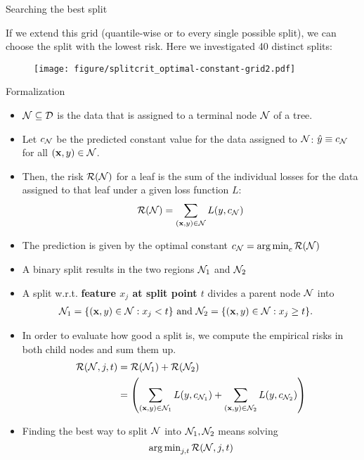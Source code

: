 \documentclass[11pt,compress,t,notes=noshow, xcolor=table]{beamer}
\begin{document}
\begin{vbframe}{Searching the best split}

If we extend this grid (quantile-wise or to every single possible split), we can choose the split with the lowest risk. 
Here we investigated 40 distinct splits:

\begin{figure}
\texttt{[image: figure/splitcrit\_optimal-constant-grid2.pdf]} 
\end{figure}


\end{vbframe}

\begin{vbframe}{Formalization}

\begin{itemize}
\item $\mathcal{N} \subseteq \mathcal{D}$ is the data that is assigned to a terminal node $\mathcal{N}$ of a tree.
\item Let $c_{\mathcal{N}}$ be the predicted constant value for the data assigned to $\mathcal{N}$: $\hat{y} \equiv c_{\mathcal{N}}$ for all $\left(\mathbf{x}, y\right) \in \mathcal{N}$.
\item Then, the risk $\mathcal{R}(\mathcal{N})$ for a leaf is the sum of the individual losses for the data assigned to that leaf under a given loss function $L$:
  $$\mathcal{R}(\mathcal{N}) = \sum\limits_{(\mathbf{x}, y) \in \mathcal{N}} L(y, c_{\mathcal{N}})$$
\item The prediction is given by the optimal constant $c_{\mathcal{N}} = \operatorname{arg\,min}_c \mathcal{R}(\mathcal{N})$
\item A binary split results in the two regions $\mathcal{N}_1$ and $\mathcal{N}_2$
\end{itemize}

\framebreak

\begin{itemize}
\item A split w.r.t. \textbf{feature $x_j$ at split point $t$} divides a parent node $\mathcal{N}$ into 
  \begin{align*}
    \mathcal{N}_1 &= \{ (\mathbf{x}, y) \in \mathcal{N}: x_j < t \} \text{ and } \mathcal{N}_2 = \{ (\mathbf{x}, y) \in \mathcal{N}: x_j \geq t \}.
  \end{align*}
\item   
  In order to evaluate how good a split is, we compute the empirical risks
  in both child nodes and sum them up.
     \begin{align*}
      \mathcal{R}(\mathcal{N}, j, t) &=  \mathcal{R}(\mathcal{N}_1) +  \mathcal{R}(\mathcal{N}_2) \\
                  &= \left(\sum\limits_{(\mathbf{x},y) \in \mathcal{N}_1} L(y, c_{\mathcal{N}_1}) + \sum\limits_{(\mathbf{x},y) \in \mathcal{N}_2} L(y, c_{\mathcal{N}_2})\right)
      \end{align*}
  \item Finding the best way to split $\mathcal{N}$ into $\mathcal{N}_1, \mathcal{N}_2$ means solving
  $$\operatorname{arg\,min}_{j, t} \mathcal{R}(\mathcal{N}, j, t)$$
\end{itemize}


\end{vbframe}
\end{document}
